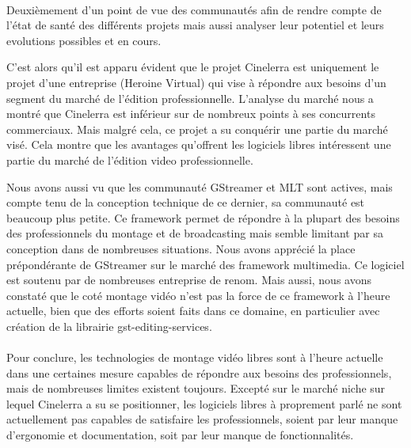 \paragraph{}

Deuxièmement d'un point de vue des communautés afin de rendre compte
de l'état de santé des différents projets mais aussi analyser leur
potentiel et leurs evolutions possibles et en cours.

C'est alors qu'il est apparu évident que le projet Cinelerra est
uniquement le projet d'une entreprise (Heroine Virtual) qui vise
à répondre aux besoins d'un segment du marché de l'édition
professionnelle. L'analyse du marché nous a montré que Cinelerra
est inférieur sur de nombreux points à ses concurrents commerciaux.
Mais malgré cela, ce projet a su conquérir une partie du marché
visé. Cela montre que les avantages qu'offrent les logiciels libres
intéressent une partie du marché de l'édition video professionnelle.


Nous avons aussi vu que les communauté GStreamer et MLT sont actives,
mais compte tenu de la conception technique de ce dernier, sa communauté
est beaucoup plus petite. Ce framework permet de répondre à la plupart
des besoins des professionnels du montage et de broadcasting mais semble
limitant par sa conception dans de nombreuses situations.  Nous avons
apprécié la place prépondérante de GStreamer sur le marché des
framework multimedia. Ce logiciel est soutenu par de nombreuses entreprise
de renom. Mais aussi, nous avons constaté que le coté montage vidéo
n'est pas la force de ce framework à l'heure actuelle, bien que des
efforts soient faits dans ce domaine, en particulier avec création de
la librairie gst-editing-services.

\paragraph{}

Pour conclure, les technologies de montage vidéo libres sont à l'heure
actuelle dans une certaines mesure capables de répondre aux besoins des
professionnels, mais de nombreuses limites existent toujours. Excepté
sur le marché niche sur lequel Cinelerra a su se positionner, les
logiciels libres à proprement parlé ne sont actuellement pas capables
de satisfaire les professionnels, soient par leur manque d'ergonomie et
documentation, soit par leur manque de fonctionnalités.

\paragraph{}

